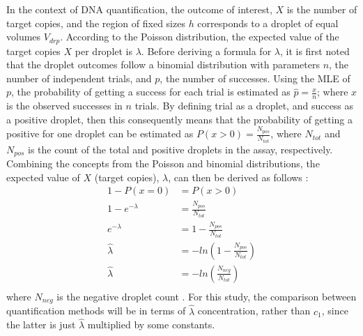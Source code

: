In the context of DNA quantification, the outcome of interest, \(X\) is the number of target copies, and the region of fixed sizes \(h\) corresponds to a droplet of equal volumes \(V_{drp}\). According to the Poisson distribution, the expected value of the target copies \(X\) per droplet is \(\lambda\). Before deriving a formula for \(\lambda\), it is first noted that the droplet outcomes follow a binomial distribution with parameters \(n\), the number of independent trials, and \(p\), the number of successes. Using the MLE of \(p\), the probability of getting a success for each trial is estimated as \(\hat{p}=\frac{x}{n}\); where \(x\) is the observed successes in \(n\) trials. By defining trial as a droplet, and success as a positive droplet, then this consequently means that the probability of getting a positive for one droplet can be estimated as \(P(x>0) = \frac{N_{pos}}{N_{tot}}\), where \(N_{tot}\) and \(N_{pos}\) is the count of the total and positive droplets in the assay, respectively. Combining the concepts from the Poisson and binomial distributions, the expected value of \(X\) (target copies), \(\lambda\), can then be derived as follows :
\begin{equation}
    \begin{aligned}
        1-P(x=0) &= P(x>0)\\
        1-e^{-\lambda} &= \frac{N_{pos}}{N_{tot}}\\
        e^{-\lambda} &= 1-\frac{N_{pos}}{N_{tot}}\\
        \hat{\lambda} &= -ln(1-\frac{N_{pos}}{N_{tot}})\\
        \hat{\lambda} &= -ln(\frac{N_{neg}}{N_{tot}}) \label{eq:lambda} \\
    \end{aligned}
\end{equation}
where \(N_{neg}\) is the negative droplet count \cite{Tzonev2018}. For this study, the comparison between quantification methods will be in terms of \(\hat{\lambda}\) concentration, rather than \(c_{1}\),  since the latter is just \(\hat{\lambda}\) multiplied by some constants.


